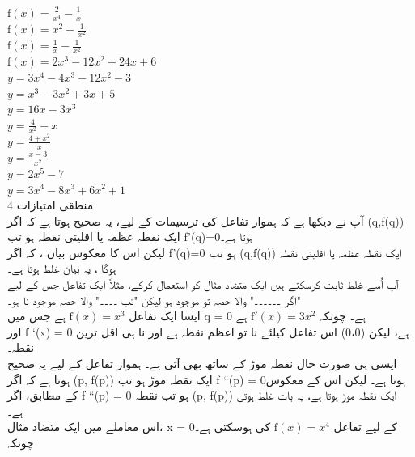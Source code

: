 \( \text{f}(x) = \frac{2}{x^4} - \frac{1}{x} \)\\
\( \text{f}(x) = x^2 + \frac{1}{x^2} \)\\
\( \text{f}(x) = \frac{1}{x} - \frac{1}{x^2} \)\\
\( \text{f}(x) = 2x^3 - 12x^2 + 24x + 6 \)\\
\( y = 3x^4 - 4x^3 - 12x^2 - 3 \)\\
\( y = x^3 - 3x^2 + 3x + 5 \)\\
\( y = 16x - 3x^3 \)\\
\( y = \frac{4}{x^2} - x \)\\
\( y = \frac{4 + x^2}{x} \)\\
\( y = \frac{x - 3}{x^2} \)\\
\( y = 2x^5 - 7 \)\\
\( y = 3x^4 - 8x^3 + 6x^2 + 1 \)\\
			
4 منطقی امتیازات\\
آپ نے دیکھا ہے کہ ہموار تفاعل کی ترسیمات کے لیے، یہ صحیح ہوتا ہے کہ
اگر (q,f(q)) ایک نقطہ عظمہ یا اقلیتی نقطہ ہو تب f'(q)=0ہوتا ہے۔\\
لیکن اس کا معکوس بیان ، کہ
اگر f'(q)=0 ہو تب (q,f(q))   ایک نقطہ عظمہ یا اقلیتی نقطہ ہوگا ،   یہ بیان غلط ہوتا ہے۔ \\
آپ اُسے غلط ثابت کرسکتے ہیں ایک متضاد مثال کو استعمال کرکے، مثلاً ایک تفاعل جس کے لیے "اگر ۔۔۔۔۔۔" والا حصہ تو موجود ہو لیکن "تب ۔۔۔۔" والا حصہ موجود نا ہو۔ \\
	ایسا ایک تفاعل
\( \text{f}(x) = x^{3} \)
	  ہے جس میں q = 0 ہے۔ چونکہ
\( \text{f}'(x) = 3x^{2 }\)
	    ہے\\
اور f `(x) = 0 ہے، لیکن (0،0) اس تفاعل کیلئے نا تو اعظم نقطہ ہے اور نا ہی اقل ترین نقطہ۔ \\
ایسی ہی صورت حال نقطہ موڑ کے ساتھ بھی آتی ہے۔ ہموار تفاعل کے لیے یہ صحیح ہوتا ہے کہ
	اگر (p, f(p)) ایک نقطہ موڑ ہو تب f ``(p) = 0ہوتا ہے۔ لیکن اس کے معکوس کے مطابق،
اگر f ``(p) = 0 ہو تب نقطہ (p, f(p))  ایک نقطہ موڑ ہوتا ہے، یہ بات غلط ہوتی ہے۔ \\
	اس معاملے میں ایک متضاد مثال، x = 0کے لیے تفاعل
	\( \text{f}(x) = x^{4} \)
	 کی ہوسکتی ہے۔ چونکہ 

